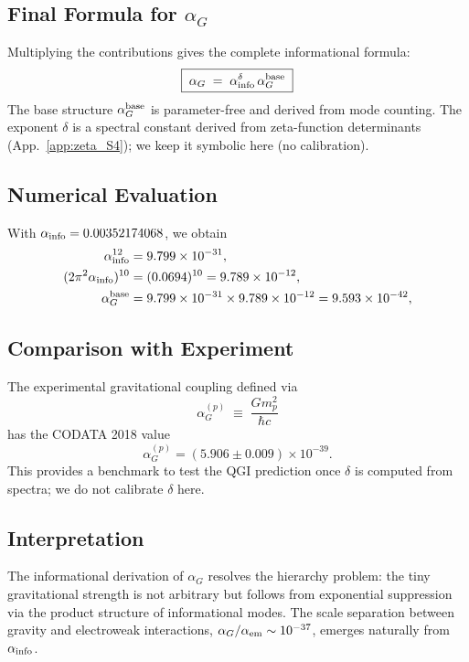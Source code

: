 \documentclass{article}
\numberwithin{equation}{section}
\theoremstyle{plain}
\theoremstyle{definition}
\theoremstyle{remark}
\newcommand{\ainfoapprox}{0.00352174068}
\begin{document}
\subsection{Final Formula for $\alpha_G$}
Multiplying the contributions gives the complete informational formula:
\begin{equation}
\boxed{\;
\alpha_G \;=\; \alpha_{\rm info}^{\delta} \, \alpha_G^{\rm base}
\;}
\end{equation}
The base structure $\alpha_G^{\rm base}$ is parameter-free and derived from mode counting. The exponent $\delta$ is a spectral constant derived from zeta-function determinants (App.~\ref{app:zeta_S4}); we keep it symbolic here (no calibration).

\subsection{Numerical Evaluation}
With $\alpha_{\rm info} = \ainfoapprox$, we obtain
\begin{align}
\alpha_{\rm info}^{12} &= 9.799 \times 10^{-31}, \\
(2\pi^2 \alpha_{\rm info})^{10} &= (0.0694)^{10} = 9.789 \times 10^{-12}, \\
\alpha_G^{\rm base} &= 9.799 \times 10^{-31} \times 9.789 \times 10^{-12} = 9.593 \times 10^{-42}, \\
\end{align}

\subsection{Comparison with Experiment}
The experimental gravitational coupling defined via
\begin{equation}
\alpha_G^{(p)} \;\equiv\; \frac{G m_p^2}{\hbar c}
\end{equation}
has the CODATA 2018 value \cite{CODATA2018}
\begin{equation}
\alpha_G^{(p)} = (5.906 \pm 0.009)\times 10^{-39}.
\end{equation}
This provides a benchmark to test the QGI prediction once $\delta$ is computed from spectra; we do not calibrate $\delta$ here.

\subsection{Interpretation}
The informational derivation of $\alpha_G$ resolves the hierarchy problem: 
the tiny gravitational strength is not arbitrary but follows from exponential suppression via the product structure of informational modes. 
The scale separation between gravity and electroweak interactions, $\alpha_G/\alpha_{\rm em} \sim 10^{-37}$, emerges naturally from $\alpha_{\rm info}$.
\end{document}

